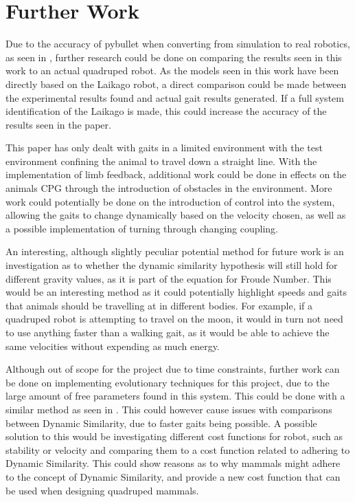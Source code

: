 \section{Further Work}
 Due to the accuracy of pybullet when converting from simulation to real robotics, as seen in \cite{}, further research could be done on comparing the results seen in this work to an actual quadruped robot. As the models seen in this work have been directly based on the Laikago robot, a direct comparison could be made between the experimental results found and actual gait results generated. If a full system identification of the Laikago is made, this could increase the accuracy of the results seen in the paper.

This paper has only dealt with gaits in a limited environment with the test environment confining the animal to travel down a straight line. With the implementation of limb feedback, additional work could be done in effects on the animals CPG through the introduction of obstacles in the environment. More work could potentially be done on the introduction of control into the system, allowing the gaits to change dynamically based on the velocity chosen, as well as a possible implementation of turning through changing coupling.

An interesting, although slightly peculiar potential method for future work is an investigation as to whether the dynamic similarity hypothesis will still hold for different gravity values, as it is part of the equation for Froude Number. This would be an interesting method as it could potentially highlight speeds and gaits that animals should be travelling at in different bodies. For example, if a quadruped robot is attempting to travel on the moon, it would in turn not need to use anything faster than a walking gait, as it would be able to achieve the same velocities without expending as much energy.  

Although out of scope for the project due to time constraints, further work can be done on implementing evolutionary techniques for this project, due to the large amount of free parameters found in this system. This could be done with a similar method as seen in \cite{Geijtenbeek2013}. This could however cause issues with comparisons between Dynamic Similarity, due to faster gaits being possible. A possible solution to this would be investigating different cost functions for robot, such as stability or velocity and comparing them to a cost function related to adhering to Dynamic Similarity. This could show reasons as to why mammals might adhere to the concept of Dynamic Similarity, and provide a new cost function that can be used when designing quadruped mammals.


